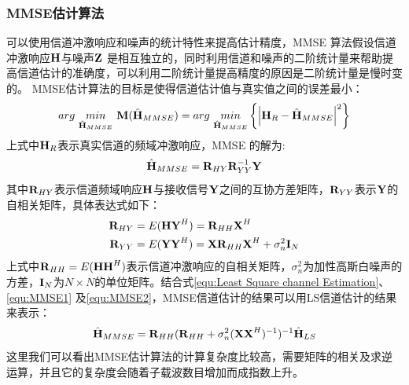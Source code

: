 \subsubsection{MMSE估计算法}
可以使用信道冲激响应和噪声的统计特性来提高估计精度，MMSE 算法假设信道冲激响应$\textbf H$与噪声$\textbf Z$ 是相互独立的，同时利用信道和噪声的二阶统计量来帮助提高信道估计的准确度，可以利用二阶统计量提高精度的原因是二阶统计量是慢时变的。
MMSE估计算法的目标是使得信道估计值与真实值之间的误差最小：
\begin{equation}
arg\ \underset {{\hat{\textbf H}_{MMSE}}}{min}\ {\textbf M} ({\hat{\textbf H}_{MMSE}})=arg\ \underset {{\hat{\textbf H}_{MMSE}}}{min}\left \{  {\left |{\textbf H_{R}}- {\hat{\textbf H}_{MMSE}} \right|}^2\right\}
\end{equation}
上式中$\textbf H_R$表示真实信道的频域冲激响应，MMSE 的解为\cite{Kay1993FSS}:
\begin{equation}
\hat{\textbf H}_{MMSE}= \textbf R_{HY}\textbf R_{YY}^{-1}\textbf Y
\label{equ:MMSE1}
\end{equation}
其中$\textbf R_{HY}$表示信道频域响应$\textbf H$与接收信号$\textbf Y$之间的互协方差矩阵，$\textbf R_{YY}$表示$\textbf Y$的自相关矩阵，具体表达式如下：
\begin{equation}
\begin{aligned}
\textbf R_{HY}&=E(\textbf H{\textbf Y}^H)={\textbf R}_{HH}{\textbf X}^H \\
\textbf R_{YY} &= E({\textbf Y}{\textbf Y}^H)={\textbf X}{\textbf R}_{HH}{\textbf X}^H + \sigma_n^2{\textbf I}_N
\end{aligned}
\label{equ:MMSE2}
\end{equation}
上式中$\textbf R_{HH}=E(\textbf H {\textbf H}^H)$表示信道冲激响应的自相关矩阵，$\sigma_n^2$为加性高斯白噪声的方差，$\textbf I_N$为$N\times N$的单位矩阵。结合式\ref{equ:Least Square channel Estimation}、\ref{equ:MMSE1} 及\ref{equ:MMSE2}，MMSE信道估计的结果可以用LS信道估计的结果来表示：
\begin{equation}
\hat{\textbf H}_{MMSE}= \textbf R_{HH}(\textbf R_{HH}+\sigma_n^2(\textbf X \textbf X^H)^{-1})^{-1}{\hat{\textbf H}_{LS}}
\label{equ:MMSE3}
\end{equation}
这里我们可以看出MMSE估计算法的计算复杂度比较高，需要矩阵的相关及求逆运算，并且它的复杂度会随着子载波数目增加而成指数上升。
